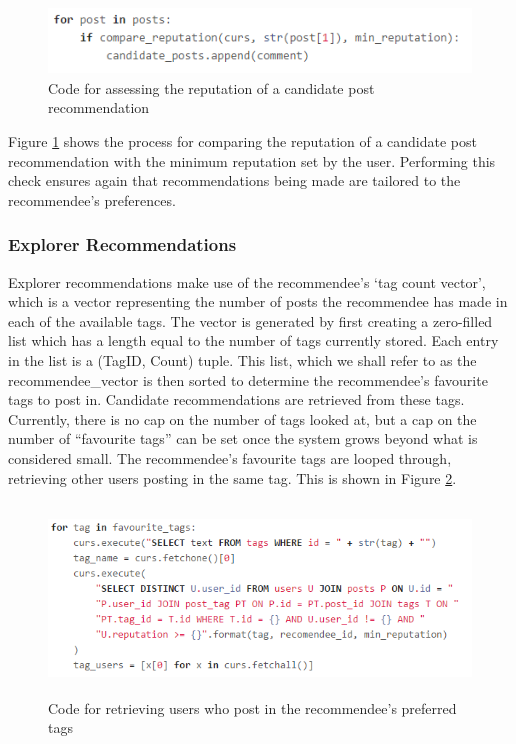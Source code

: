 \begin{figure}[H]
\centering
\includegraphics[height=0.7in]{Images/Implementation/FOFPostReputation}
\caption{Code for assessing the reputation of a candidate post recommendation}
\label{fig:FOFPostReputation}
\end{figure} 

\noindent Figure \ref{fig:FOFPostReputation} shows the process for comparing the reputation of a candidate post recommendation with the minimum reputation set by the user. Performing this check ensures again that recommendations being made are tailored to the recommendee's preferences.

\subsubsection{Explorer Recommendations}
Explorer recommendations make use of the recommendee's `tag count vector', which is a vector representing the number of posts the recommendee has made in each of the available tags. The vector is generated by first creating a zero-filled list which has a length equal to the number of tags currently stored. Each entry in the list is a (TagID, Count) tuple. This list, which we shall refer to as the recommendee\_vector is then sorted to determine the recommendee's favourite tags to post in. Candidate recommendations are retrieved from these tags. Currently, there is no cap on the number of tags looked at, but a cap on the number of ``favourite tags'' can be set once the system grows beyond what is considered small. The recommendee's favourite tags are looped through, retrieving other users posting in the same tag. This is shown in Figure \ref{fig:ExplorerFavouriteTags}.

\begin{figure}[H]
\centering
\includegraphics[height=2in]{Images/Implementation/ExplorerFavouriteTags}
\caption{Code for retrieving users who post in the recommendee's preferred tags}
\label{fig:ExplorerFavouriteTags}
\end{figure}

